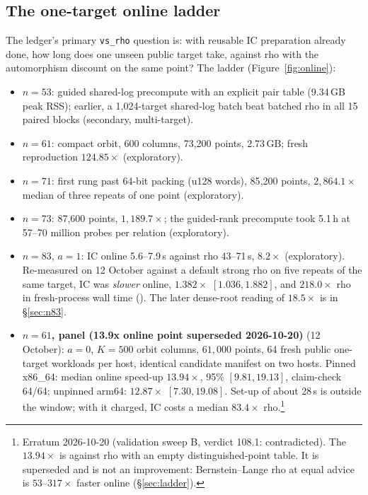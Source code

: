 \subsection{The one-target online ladder}

The ledger's primary \texttt{vs\_rho} question is: with reusable IC
preparation already done, how long does one unseen public target take,
against rho with the automorphism discount on the same point? The ladder
(Figure~\ref{fig:online}):

\begin{itemize}
\item $n=53$: guided shared-log precompute with an explicit pair table
  (9.34\,GB peak RSS); earlier, a 1{,}024-target shared-log batch beat
  batched rho in all 15 paired blocks (secondary, multi-target).
\item $n=61$: compact orbit, 600 columns, 73{,}200 points, 2.73\,GB; fresh
  reproduction $124.85\times$ (exploratory).
\item $n=71$: first rung past 64-bit packing (u128 words), 85{,}200
  points, $2{,}864.1\times$ median of three repeats of one point
  (exploratory).
\item $n=73$: 87{,}600 points, $1{,}189.7\times$; the guided-rank
  precompute took 5.1\,h at 57--70 million probes per relation
  (exploratory).
\item $n=83$, $a=1$: IC online 5.6--7.9\,s against rho 43--71\,s,
  $8.2\times$ (exploratory). Re-measured on 12 October against a default
  strong rho on five repeats of the same target, IC was \emph{slower}
  online, $1.382\times$ $[1.036,1.882]$, and $218.0\times$ rho in
  fresh-process wall time (). The
  later dense-root reading of $18.5\times$ is in \S\ref{sec:n83}.
\item \textbf{$n=61$, panel (13.9x online point superseded 2026-10-20)} (12 October): $a=0$, $K=500$ orbit
  columns, $61{,}000$ points, 64 fresh public one-target workloads per
  host, identical candidate manifest on two hosts. Pinned x86\_64:
  median online speed-up $13.94\times$, 95\% $[9.81,19.13]$, claim-check
  64/64; unpinned arm64: $12.87\times$ $[7.30,19.08]$. Set-up of about
  28\,s is outside the window; with it charged, IC costs a median
  $83.4\times$ rho.\footnote{Erratum 2026-10-20 (validation sweep B,
  verdict 108.1: contradicted). The $13.94\times$ is against rho with an
  empty distinguished-point table. It is superseded and is not an
  improvement: Bernstein--Lange rho at equal advice is $53$--$317\times$
  faster online (\S\ref{sec:ladder}).}
\end{itemize}

